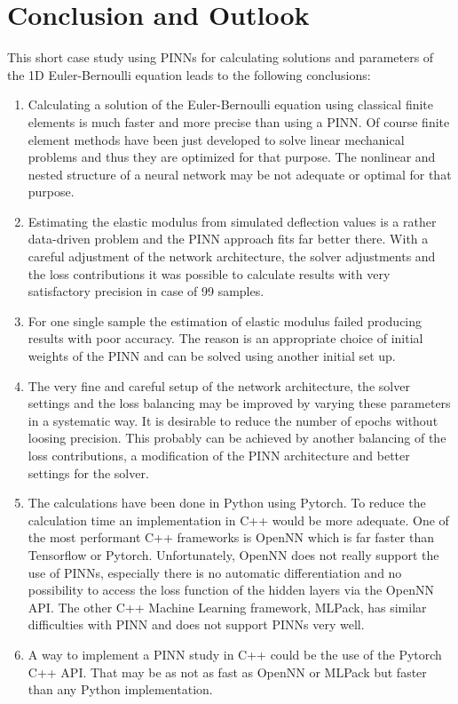 \documentclass[a4paper,11pt]{article}
\begin{document}
\section{Conclusion and Outlook}
This short case study using PINNs for calculating solutions and parameters of the 1D Euler-Bernoulli equation leads to the following conclusions:
\begin{enumerate}
\item
Calculating a solution of the Euler-Bernoulli equation using classical finite elements is much faster and more precise than using a PINN. Of course finite element methods have been just developed to solve linear mechanical problems and thus they are optimized for that purpose. The nonlinear and nested structure of  a neural network may be not adequate or optimal for that purpose.
\item
Estimating the elastic modulus from simulated deflection values is a rather data-driven problem and the PINN approach fits far better there. With a careful adjustment of the network architecture, the solver adjustments and the loss contributions it was possible to calculate results with very satisfactory precision in case of 99 samples.
\item
For one single sample the estimation of elastic modulus failed producing results with poor accuracy. The reason is an appropriate choice of initial weights of the PINN and can be solved using another initial set up.
\item
The very fine and careful setup of the network architecture, the solver settings and the loss balancing may be improved by varying these parameters in a systematic way. It is desirable to reduce the number of epochs without loosing precision. This probably can be achieved by another balancing of the loss contributions, a modification of the PINN architecture and better settings for the solver.
\item
The calculations have been done in Python using Pytorch. To reduce the calculation time an implementation in C++ would be more adequate. One of the most performant  C++ frameworks is OpenNN which is far faster than Tensorflow or Pytorch. Unfortunately, OpenNN does not really support the use of PINNs, especially there is no automatic differentiation and no possibility to access the loss function of the hidden layers via the OpenNN API. The other C++ Machine Learning framework, MLPack, has similar difficulties with PINN and does not support PINNs very well.
\item
A way to implement a PINN study in C++ could be the use of the Pytorch C++ API. That may be as not as fast as OpenNN or MLPack but faster than any Python implementation.
\end{enumerate}
\end{document}
